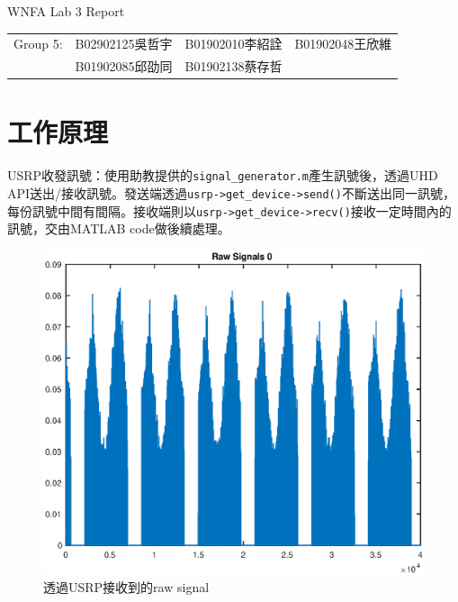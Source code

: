 \documentclass[10pt,a4paper]{article}
\begin{document}
\thispagestyle{fancy}

\begin{center}
    \LARGE WNFA Lab 3 Report
\end{center}
\begin{center}\begin{tabular}{lccr}
    Group 5: & B02902125吳哲宇 & B01902010李紹詮 & B01902048王欣維 \\
    & B01902085邱劭同 & B01902138蔡存哲
\end{tabular}\end{center}

\section*{工作原理}
USRP收發訊號：使用助教提供的\texttt{signal\_generator.m}產生訊號後，透過UHD API送出/接收訊號。發送端透過\texttt{usrp->get\_device->send()}不斷送出同一訊號，每份訊號中間有間隔。接收端則以\texttt{usrp->get\_device->recv()}接收一定時間內的訊號，交由MATLAB code做後續處理。

\begin{figure}[h]
    \centering
    \includegraphics[trim=30 10 30 10,clip,width=0.6\linewidth]
    {figures/raw_signal}
    \caption{透過USRP接收到的raw signal}
\end{figure}
\end{document}
